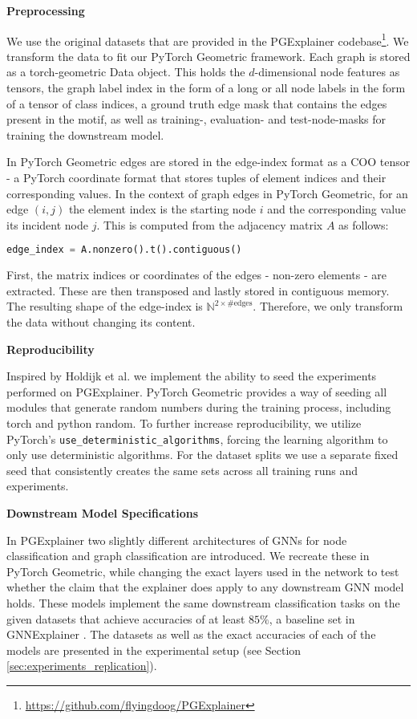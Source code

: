 \textbf{Preprocessing}\par
 We use the original datasets that are provided in the PGExplainer codebase\footnote{\url{https://github.com/flyingdoog/PGExplainer}}. We transform the data to fit our PyTorch Geometric framework. Each graph is stored as a torch-geometric Data object. This holds the $d$-dimensional node features as tensors, the graph label index in the form of a long or all node labels in the form of a tensor of class indices, a ground truth edge mask that contains the edges present in the motif, as well as training-, evaluation- and test-node-masks for training the downstream model. 
 
 In PyTorch Geometric edges are stored in the edge-index format as a COO tensor - a PyTorch coordinate format that stores tuples of element indices and their corresponding values. In the context of graph edges in PyTorch Geometric, for an edge $(i,j)$ the element index is the starting node $i$ and the corresponding value its incident node $j$. This is computed from the adjacency matrix $A$ as follows:
\begin{lstlisting}[language=Python, caption=Edge index transformation, label=lst:edge_index]
    edge_index = A.nonzero().t().contiguous()
\end{lstlisting}
First, the matrix indices or coordinates of the edges - non-zero elements - are extracted. These are then transposed and lastly stored in contiguous memory. The resulting shape of the edge-index is $\mathbb{N}^{2\times \text{\#edges}}$. Therefore, we only transform the data without changing its content. \bigskip

\textbf{Reproducibility}\par
 Inspired by Holdijk et al. \cite{holdijk2021re} we implement the ability to seed the experiments performed on PGExplainer. PyTorch Geometric provides a way of seeding all modules that generate random numbers during the training process, including torch and python random.
To further increase reproducibility, we utilize PyTorch's \lstinline|use_deterministic_algorithms|, forcing the learning algorithm to only use deterministic algorithms. For the dataset splits we use a separate fixed seed that consistently creates the same sets across all training runs and experiments.\bigskip

\textbf{Downstream Model Specifications}\par
 In PGExplainer two slightly different architectures of GNNs for node classification and graph classification are introduced. We recreate these in PyTorch Geometric, while changing the exact layers used in the network to test whether the claim that the explainer does apply to any downstream GNN model holds. These models implement the same downstream classification tasks on the given datasets that achieve accuracies of at least $85\%$, a baseline set in GNNExplainer \cite{ying2019gnnexplainer}. The datasets as well as the exact accuracies of each of the models are presented in the experimental setup (see Section \ref{sec:experiments_replication}). 

